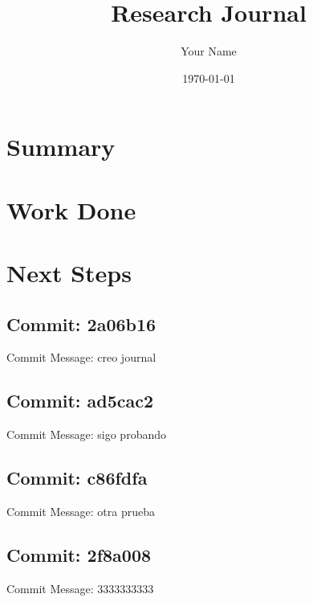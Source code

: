 \documentclass{article}
\begin{document}
\title{Research Journal}
\author{Your Name}
\date{\today}

\maketitle

\section{Summary}

\section{Work Done}

\section{Next Steps}


\subsection{Commit: 2a06b16}

Commit Message: creo journal


\subsection{Commit: ad5cac2}

Commit Message: sigo probando


\subsection{Commit: c86fdfa}

Commit Message: otra prueba


\subsection{Commit: 2f8a008}

Commit Message: 3333333333
\end{document}
